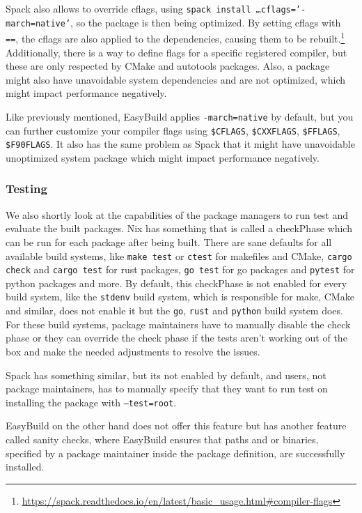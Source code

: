\documentclass[conference,final,a4paper]{IEEEtran}
\begin{document}
Spack also allows to override cflags, using \texttt{spack install \ldots cflags='-march=native'}, so the package is then being optimized.
By setting cflags with \texttt{==}, the cflags are also applied to the dependencies, causing them to be rebuilt.\footnote{\url{https://spack.readthedocs.io/en/latest/basic_usage.html\#compiler-flags}}
Additionally, there is a way to define flags for a specific registered compiler, but these are only respected by CMake and autotools packages.
Also, a package might also have unavoidable system dependencies and are not optimized, which might impact performance negatively.

Like previously mentioned, EasyBuild applies \texttt{-march=native} by default, but you can further customize your compiler flags using \texttt{\$CFLAGS}, \texttt{\$CXXFLAGS}, \texttt{\$FFLAGS}, \texttt{\$F90FLAGS}.
It also has the same problem as Spack that it might have unavoidable unoptimized system package which might impact performance negatively.\\

\subsubsection{Testing}

We also shortly look at the capabilities of the package managers to run test and evaluate the built packages.
Nix has something that is called a checkPhase which can be run for each package after being built.
There are sane defaults for all available build systems, like \texttt{make test} or \texttt{ctest} for makefiles and CMake, \texttt{cargo check} and \texttt{cargo test} for rust packages, \texttt{go test} for go packages and \texttt{pytest} for python packages and more.
By default, this checkPhase is not enabled for every build system, like the \texttt{stdenv} build system, which is responsible for make, CMake and similar, does not enable it but the \texttt{go}, \texttt{rust} and \texttt{python} build system does.
For these build systems, package maintainers have to manually disable the check phase or they can override the check phase if the tests aren't working out of the box and make the needed adjustments to resolve the issues.

Spack has something similar, but its not enabled by default, and users, not package maintainers, has to manually specify that they want to run test on installing the package with \texttt{--test=root}.

EasyBuild on the other hand does not offer this feature but has another feature called sanity checks, where EasyBuild ensures that paths and or binaries, specified by a package maintainer inside the package definition, are successfully installed.
\end{document}
